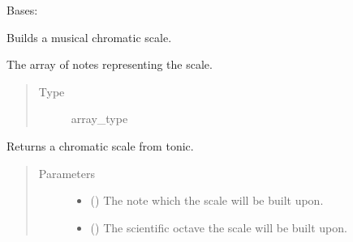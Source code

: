 \documentclass[letterpaper,10pt,english]{sphinxmanual}
\begin{document}
\begin{fulllineitems}
\label{\detokenize{birdears:birdears.scale.ChromaticScale}}
Bases: {\hyperref[\detokenize{index:birdears.scale.ScaleBase}]{}}

Builds a musical chromatic scale.

\begin{fulllineitems}
\label{\detokenize{birdears:birdears.scale.ChromaticScale.scale}}
The array of notes representing the scale.
\begin{quote}\begin{description}
\item[{Type}] \leavevmode
array\_type

\end{description}\end{quote}

\end{fulllineitems}


\begin{fulllineitems}
\label{\detokenize{birdears:birdears.scale.ChromaticScale.__init__}}
Returns a chromatic scale from tonic.
\begin{quote}\begin{description}
\item[{Parameters}] \leavevmode\begin{itemize}
\item {} 
 () \textendash{} The note which the scale will be built upon.

\item {} 
 () \textendash{} The scientific octave the scale will be built upon.


\end{itemize}
\end{description}
\end{quote}
\end{fulllineitems}
\end{fulllineitems}
\end{document}
